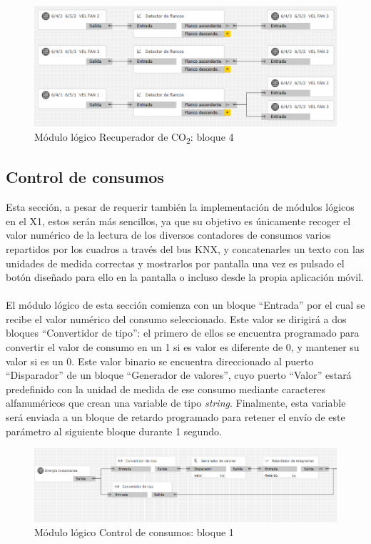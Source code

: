\begin{figure}[H]
\centering
\includegraphics[width=1\textwidth]{figures/log_co2_b4.png}   
\caption{Módulo lógico Recuperador de CO\textsubscript{2}: bloque 4}
\label{fig:log_co2_b4}
\end{figure}


\subsection{Control de consumos}Esta sección, a pesar de requerir también la implementación de módulos lógicos en el X1, estos serán más sencillos, ya que su objetivo es únicamente recoger el valor numérico de la lectura de los diversos contadores de consumos varios repartidos por los cuadros a través del bus KNX, y concatenarles un texto con las unidades de medida correctas y mostrarlos por pantalla una vez es pulsado el botón diseñado para ello en la pantalla o incluso desde la propia aplicación móvil. \\\\
El módulo lógico de esta sección comienza con un bloque “Entrada” por el cual se recibe el valor numérico del consumo seleccionado. Este valor se dirigirá a dos bloques “Convertidor de tipo”: el primero de ellos se encuentra programado para convertir el valor de consumo en un 1 si es valor es diferente de 0, y mantener su valor si es un 0. Este valor binario se encuentra direccionado al puerto “Disparador” de un bloque “Generador de valores”, cuyo puerto “Valor” estará predefinido con la unidad de medida de ese consumo mediante caracteres alfanuméricos que crean una variable de tipo \textit{string}. Finalmente, esta variable será enviada a un bloque de retardo programado para retener el envío de este parámetro al siguiente bloque durante 1 segundo.
\begin{figure}[H]
\centering
\includegraphics[width=1\textwidth]{figures/log_consu_b1.png}   
\caption{Módulo lógico Control de consumos: bloque 1}
\label{fig:log_consu_b1}
\end{figure}
